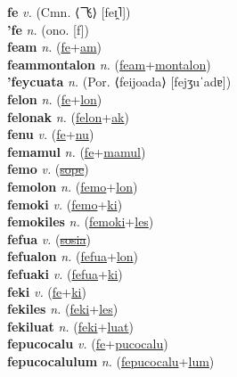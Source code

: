 \textbf{fe} \textit{v.} (Cmn. ⟨飞⟩ [feɪ̯˥])
 \label{fe} \\
\textbf{'fe} \textit{n.} (ono. [f])
 \label{'fe} \\
\textbf{feam} \textit{n.} (\hyperref[fe]{fe}+\hyperref[am]{am})
 \label{feam} \\
\textbf{feammontalon} \textit{n.} (\hyperref[feam]{feam}+\hyperref[montalon]{montalon})
 \label{feammontalon} \\
\textbf{'feycuata} \textit{n.} (Por. ⟨feijoada⟩ [fejʒuˈadɐ])
 \label{'feycuata} \\
\textbf{felon} \textit{n.} (\hyperref[fe]{fe}+\hyperref[lon]{lon})
 \label{felon} \\
\textbf{felonak} \textit{n.} (\hyperref[felon]{felon}+\hyperref[ak]{ak})
 \label{felonak} \\
\textbf{fenu} \textit{v.} (\hyperref[fe]{fe}+\hyperref[nu]{nu})
 \label{fenu} \\
\textbf{femamul} \textit{n.} (\hyperref[fe]{fe}+\hyperref[mamul]{mamul})
 \label{femamul} \\
\textbf{femo} \textit{v.} (\hyperref[sope]{\sout{sope}})
 \label{femo} \\
\textbf{femolon} \textit{n.} (\hyperref[femo]{femo}+\hyperref[lon]{lon})
 \label{femolon} \\
\textbf{femoki} \textit{v.} (\hyperref[femo]{femo}+\hyperref[ki]{ki})
 \label{femoki} \\
\textbf{femokiles} \textit{n.} (\hyperref[femoki]{femoki}+\hyperref[les]{les})
 \label{femokiles} \\
\textbf{fefua} \textit{v.} (\hyperref[sosia]{\sout{sosia}})
 \label{fefua} \\
\textbf{fefualon} \textit{n.} (\hyperref[fefua]{fefua}+\hyperref[lon]{lon})
 \label{fefualon} \\
\textbf{fefuaki} \textit{v.} (\hyperref[fefua]{fefua}+\hyperref[ki]{ki})
 \label{fefuaki} \\
\textbf{feki} \textit{v.} (\hyperref[fe]{fe}+\hyperref[ki]{ki})
 \label{feki} \\
\textbf{fekiles} \textit{n.} (\hyperref[feki]{feki}+\hyperref[les]{les})
 \label{fekiles} \\
\textbf{fekiluat} \textit{n.} (\hyperref[feki]{feki}+\hyperref[luat]{luat})
 \label{fekiluat} \\
\textbf{fepucocalu} \textit{v.} (\hyperref[fe]{fe}+\hyperref[pucocalu]{pucocalu})
 \label{fepucocalu} \\
\textbf{fepucocalulum} \textit{n.} (\hyperref[fepucocalu]{fepucocalu}+\hyperref[lum]{lum})
